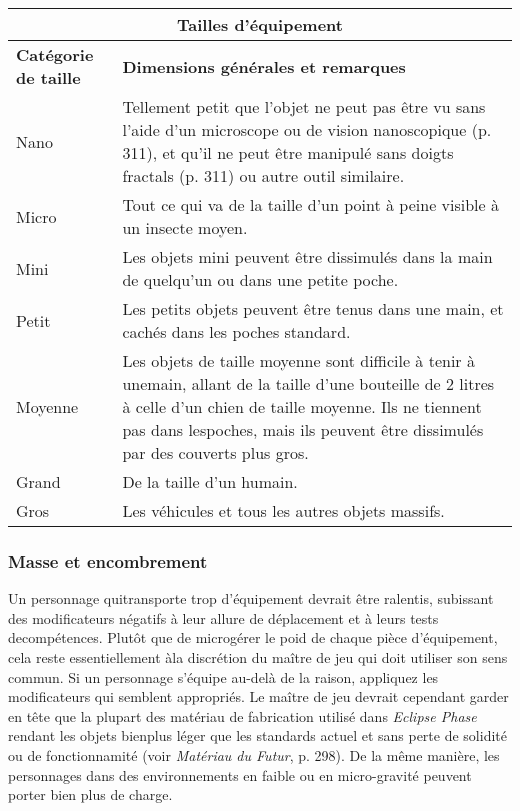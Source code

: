\begin{table} \begin{tabularx}{\textwidth}{|l|X|} \hline

\multicolumn{2}{|c|}{\textbf{Tailles d'équipement}}	\\ \hline

\textbf{Catégorie de taille}	&\textbf{Dimensions générales et remarques} \\ Nano	&Tellement petit que l'objet ne peut pas être vu sans l'aide d'un microscope ou de vision nanoscopique (p. 311), et qu'il ne peut être manipulé sans doigts fractals (p. 311) ou autre outil similaire. \\ \hline

Micro	&Tout ce qui va de la taille d'un point à peine visible à un insecte moyen. \\ \hline

Mini	&Les objets mini peuvent être dissimulés dans la main de quelqu'un ou dans une petite poche. \\ \hline

Petit	&Les petits objets peuvent être tenus dans une main, et cachés dans les poches standard.\\ \hline

Moyenne	&Les objets de taille moyenne sont difficile à tenir à unemain, allant de la taille d'une bouteille de 2 litres à celle d'un chien de taille moyenne. Ils ne tiennent pas dans lespoches, mais ils peuvent être dissimulés par des couverts plus gros. \\ \hline

Grand	&De la taille d'un humain. \\ \hline

Gros	&Les véhicules et tous les autres objets massifs. \\ \hline

\end{tabularx} \label{tab:gear-sizes} \end{table} 



\subsubsection{Masse et encombrement} 

Un personnage quitransporte trop d'équipement devrait être ralentis, subissant des modificateurs négatifs à leur allure de déplacement et à leurs tests decompétences. Plutôt que de microgérer le poid de chaque pièce d'équipement, cela reste essentiellement àla discrétion du maître de jeu qui doit utiliser son sens commun. Si un personnage s'équipe au-delà de la raison, appliquez les modificateurs qui semblent appropriés. Le maître de jeu devrait cependant garder en tête que la plupart des matériau de fabrication utilisé dans \emph{Eclipse Phase} rendant les objets bienplus léger que les standards actuel et sans perte de solidité ou de fonctionnamité (voir \emph{Matériau du Futur}, p. 298). De la même manière, les personnages dans des environnements en faible ou en micro-gravité peuvent porter bien plus de charge. 

